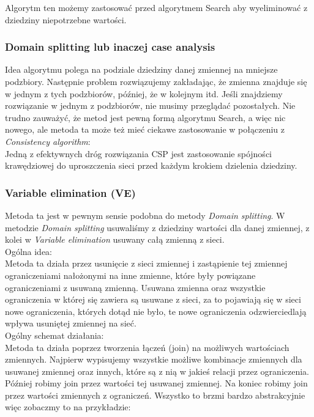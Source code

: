 \documentclass[a4paper,15pt]{article}
\begin{document}
Algorytm ten możemy zastosować przed algorytmem Search aby wyeliminować z dziedziny niepotrzebne wartości. 

\subsubsection{Domain splitting lub inaczej case analysis}
Idea algorytmu polega na podziale dziedziny danej zmiennej na mniejsze podzbiory. Następnie problem rozwiązujemy zakładając, że zmienna znajduje się w jednym z tych podzbiorów, później, że w kolejnym itd. Jeśli znajdziemy rozwiązanie w jednym z podzbiorów, nie musimy przeglądać pozostałych. Nie trudno zauważyć, że metod jest pewną formą algorytmu Search, a więc nic nowego, ale metoda ta może też mieć ciekawe zastosowanie w połączeniu z \textit{Consistency algorithm}: \\

Jedną z efektywnych dróg rozwiązania CSP jest zastosowanie spójności krawędziowej do uproszczenia sieci przed każdym krokiem dzielenia dziedziny. 

\subsubsection{Variable elimination (VE)}
Metoda ta jest w pewnym sensie podobna do metody \textit{Domain splitting}. W metodzie \textit{Domain splitting} usuwaliśmy z dziedziny wartości dla danej zmiennej, z kolei w \textit{Variable elimination} usuwany całą zmienną z sieci. \\

Ogólna idea: \\

Metoda ta działa przez usunięcie z sieci zmiennej i zastąpienie tej zmiennej ograniczeniami nałożonymi na inne zmienne, które były powiązane ograniczeniami z usuwaną zmienną. Usuwana zmienna oraz wszystkie ograniczenia w której się zawiera są usuwane z sieci, za to pojawiają się w sieci nowe ograniczenia, których dotąd nie było, te nowe ograniczenia odzwierciedlają wpływa usuniętej zmiennej na sieć. \\

Ogólny schemat działania: \\

Metoda ta działa poprzez tworzenia łączeń (join) na możliwych wartościach zmiennych. Najpierw wypisujemy wszystkie możliwe kombinacje zmiennych dla usuwanej zmiennej oraz innych, które są z nią w jakieś relacji przez ograniczenia. Później robimy join przez wartości tej usuwanej zmiennej. Na koniec robimy join przez wartości zmiennych z ograniczeń. Wszystko to brzmi bardzo abstrakcyjnie więc zobaczmy to na przykładzie:
\end{document}
